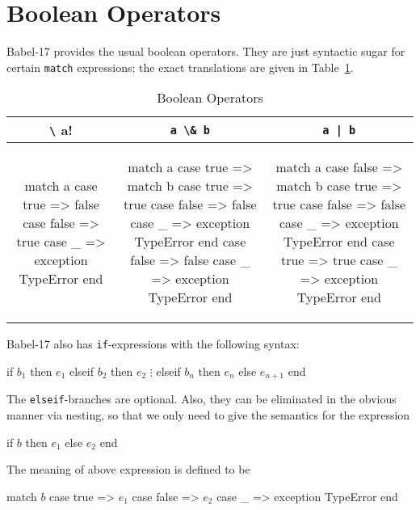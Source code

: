 \documentclass[11pt]{amsart}
\newcommand{\babelsrc}[1] {\lstinline!#1!}
\begin{document}
\section{Boolean Operators}

Babel-17 provides the usual boolean operators. They are just syntactic sugar for certain \babelsrc{match} expressions; the exact translations are given in Table~\ref{tab:booleanops}.
\begin{table}
\caption{Boolean Operators}
\begin{tabular}{c|c|c}
\babelsrc{\! a} & \babelsrc{a \& b} &\babelsrc{a | b} \\\hline
 \small
\begin{babellisting}
match a 
  case true => 
    false 
  case false => 
    true
  case _ => 
    exception TypeError
end
\end{babellisting}
 & 
 \small
\begin{babellisting}
match a 
  case true => 
    match b 
      case true => 
        true
      case false => 
        false
      case _ => 
        exception TypeError
    end 
  case false => 
    false
  case _ => 
    exception TypeError
end
\end{babellisting}
 & 
 \small
\begin{babellisting}
match a 
  case false => 
    match b 
      case true => 
        true
      case false => 
        false
      case _ => 
        exception TypeError
    end 
  case true => 
    true
  case _ => 
    exception TypeError
end
\end{babellisting}
\end{tabular}
\label{tab:booleanops}
\end{table}
Babel-17 also has \babelsrc{if}-expressions with the following syntax:
\begin{babellisting}
if $b_1$ then
  $e_1$
elseif $b_2$ then
  $e_2$
  $\vdots$
elseif $b_n$ then
  $e_n$
else
  $e_{n+1}$
end
\end{babellisting}
The \babelsrc{elseif}-branches are  optional. Also, they can be eliminated in the obvious manner via nesting, so that we only need to give the semantics for the expression
\begin{babellisting}
if $b$ then $e_1$ else $e_2$ end
\end{babellisting}
The meaning of above expression is defined to be
\begin{babellisting}
match $b$ 
  case true => $e_1$
  case false => $e_2$
  case _ => exception TypeError 
end
\end{babellisting}
\end{document}
